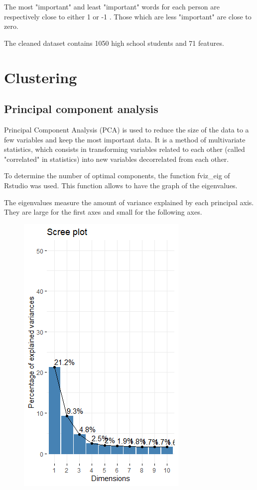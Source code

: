 \documentclass[12pt]{article}
\begin{document}
The most "important" and least "important" words for each person are respectively close to either 1 or -1 . Those which are less "important" are close to zero.

The cleaned dataset contains 1050
high school students and 71 features.


\section{Clustering} 


\subsection{Principal component analysis}

Principal Component Analysis (PCA) is used to reduce the size of the data to a few variables and keep the most important data. It is a method of multivariate statistics, which consists in transforming variables related to each other (called "correlated" in statistics) into new variables decorrelated from each other. 

To determine the number of optimal components, the function fviz\_eig of Rstudio was used. This function allows to have the graph of the eigenvalues.

The eigenvalues measure the amount of variance explained by each principal axis. They are large for the first axes and small for the following axes.


\begin{figure}[H]
\begin{center}
\includegraphics[scale=1.1]{ACP_1.png} 
\caption[]{\ }
\end{center}
\end{figure}
\end{document}
